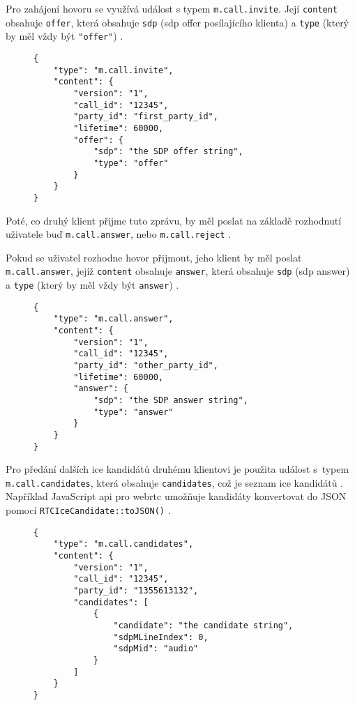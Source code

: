 Pro zahájení hovoru se využívá událost s typem \texttt{m.call.invite}.
Její \texttt{content} obsahuje \texttt{offer}, která
obsahuje \texttt{sdp} (\gls{sdp} offer posílajícího klienta) a
\texttt{type} (který by měl vždy být \texttt{"offer"})
\parencite{MatrixORG-Spec,GitHub-MSC2746}.

\begin{figure}[H]
    \begin{verbatim}
{
	"type": "m.call.invite",
	"content": {
		"version": "1",
		"call_id": "12345",
		"party_id": "first_party_id",
		"lifetime": 60000,
		"offer": {
			"sdp": "the SDP offer string",
			"type": "offer"
		}
	}
}
	\end{verbatim}
\end{figure}

Poté, co druhý klient přijme tuto zprávu, by měl poslat na základě rozhodnutí
uživatele buď \texttt{m.call.answer}, nebo
\texttt{m.call.reject} \parencite{MatrixORG-Spec,GitHub-MSC2746}.

Pokud se uživatel rozhodne hovor přijmout, jeho klient by měl poslat
\texttt{m.call.answer}, jejíž \texttt{content} obsahuje
\texttt{answer}, která obsahuje \texttt{sdp} (\gls{sdp}
answer) a \texttt{type} (který by měl vždy být
\texttt{answer}) \parencite{MatrixORG-Spec,GitHub-MSC2746}.

\begin{figure}[H]
    \begin{verbatim}
{
	"type": "m.call.answer",
	"content": {
		"version": "1",
		"call_id": "12345",
		"party_id": "other_party_id",
		"lifetime": 60000,
		"answer": {
			"sdp": "the SDP answer string",
			"type": "answer"
		}
	}
}
	\end{verbatim}
\end{figure}

Pro předání dalších \gls{ice} kandidátů druhému klientovi je použita událost
s~typem \texttt{m.call.candidates}, která obsahuje
\texttt{candidates}, což je seznam \gls{ice} kandidátů
\parencite{MatrixORG-Spec}. Například JavaScript \gls{api} pro \gls{webrtc}
umožňuje kandidáty konvertovat do JSON pomocí
\texttt{RTCIceCandidate::toJSON()}
\parencite{MDN-Web-RTCIceCandidate-ToJSON}.

\begin{figure}[H]
    \begin{verbatim}
{
	"type": "m.call.candidates",
	"content": {
		"version": "1",
		"call_id": "12345",
		"party_id": "1355613132",
		"candidates": [
			{
				"candidate": "the candidate string",
				"sdpMLineIndex": 0,
				"sdpMid": "audio"
			}
		]
	}
}
	\end{verbatim}
\end{figure}

